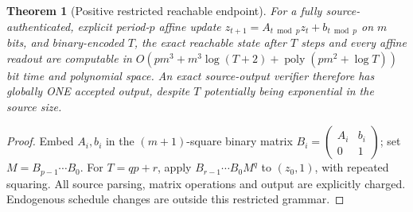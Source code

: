 \documentclass[11pt]{article}
\newtheorem{theorem}{Theorem}
\begin{document}
\begin{theorem}[Positive restricted reachable endpoint]
For a fully source-authenticated, explicit period-$p$ affine update $z_{t+1}=A_{t\bmod p}z_t+b_{t\bmod p}$ on $m$ bits, and binary-encoded $T$, the exact reachable state after $T$ steps and every affine readout are computable in $O(pm^3+m^3\log(T+2)+\operatorname{poly}(pm^2+\log T))$ bit time and polynomial space. An exact source-output verifier therefore has globally ONE accepted output, despite $T$ potentially being exponential in the source size.
\end{theorem}
\begin{proof}
Embed $A_i,b_i$ in the $(m+1)$-square binary matrix $B_i=\left(\begin{smallmatrix}A_i&b_i\\0&1\end{smallmatrix}\right)$; set $M=B_{p-1}\cdots B_0$. For $T=qp+r$, apply $B_{r-1}\cdots B_0 M^q$ to $(z_0,1)$, with repeated squaring. All source parsing, matrix operations and output are explicitly charged. Endogenous schedule changes are outside this restricted grammar.
\end{proof}
\end{document}
